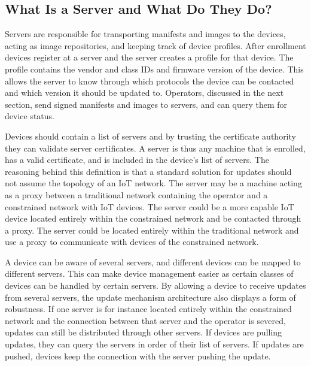 \documentclass[0-thesis.tex]{subfiles}
\begin{document}
\subsection{What Is a Server and What Do They Do?}
\label{ssec:what-is-a-server}
Servers are responsible for transporting manifests and images to the devices, acting as
image repositories, and keeping track of device profiles. After enrollment devices
register at a server and the server creates a profile for that device. The profile
contains the vendor and class IDs and firmware version of the device. This allows the
server to know through which protocols the device can be contacted and which version it
should be updated to. Operators, discussed in the next section, send signed manifests and
images to servers, and can query them for device status.

Devices should contain a list of servers and by trusting the certificate authority they
can validate server certificates. A server is thus any machine that is enrolled, has a
valid certificate, and is included in the device's list of servers. The reasoning behind
this definition is that a standard solution for updates should not assume the topology of
an IoT network. The server may be a machine acting as a proxy between a traditional
network containing the operator and a constrained network with IoT devices. The server
could be a more capable IoT device located entirely within the constrained network and be
contacted through a proxy. The server could be located entirely within the traditional
network and use a proxy to communicate with devices of the constrained network.

A device can be aware of several servers, and different devices can be mapped to different
servers. This can make device management easier as certain classes of devices can be
handled by certain servers. By allowing a device to receive updates from several servers,
the update mechanism architecture also displays a form of robustness. If one server is for
instance located entirely within the constrained network and the connection between that
server and the operator is severed, updates can still be distributed through other
servers. If devices are pulling updates, they can query the servers in order of their list
of servers. If updates are pushed, devices keep the connection with the server pushing the
update.
\end{document}
